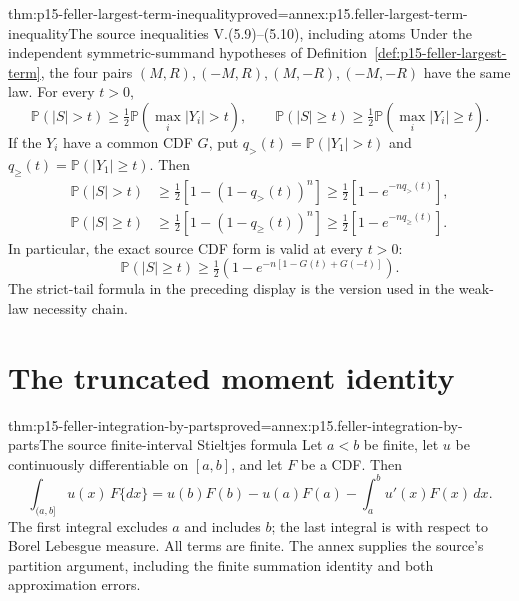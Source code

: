 \begin{hbtheorem}{thm:p15-feller-largest-term-inequality}{proved=annex:p15.feller-largest-term-inequality}{The source inequalities V.(5.9)--(5.10), including atoms}
Under the independent symmetric-summand hypotheses of
Definition~\ref{def:p15-feller-largest-term},
the four pairs \((M,R),(-M,R),(M,-R),(-M,-R)\) have the same
law. For every \(t>0\),
\[
 \mathbb P(|S|>t)\geq\tfrac12
                    \mathbb P(\max_i|Y_i|>t),\qquad
 \mathbb P(|S|\geq t)\geq\tfrac12
                    \mathbb P(\max_i|Y_i|\geq t).
\]
If the \(Y_i\) have a common CDF \(G\), put
\(q_>(t)=\mathbb P(|Y_1|>t)\) and
\(q_\geq(t)=\mathbb P(|Y_1|\geq t)\). Then
\[
 \begin{aligned}
 \mathbb P(|S|>t)&\geq\tfrac12[1-(1-q_>(t))^n]
                         \geq\tfrac12[1-e^{-nq_>(t)}],\\
 \mathbb P(|S|\geq t)&\geq\tfrac12[1-(1-q_\geq(t))^n]
                         \geq\tfrac12[1-e^{-nq_\geq(t)}].
 \end{aligned}
\]
In particular, the exact source CDF form is valid at every \(t>0\):
\[
 \mathbb P(|S|\geq t)
       \geq\tfrac12\left(1-e^{-n[1-G(t)+G(-t)]}\right).
\]
The strict-tail formula in the preceding display is the version used
in the weak-law necessity chain.
\end{hbtheorem}

\section{The truncated moment identity}
\label{sec:p15-feller-truncated-moment}

\begin{hbtheorem}{thm:p15-feller-integration-by-parts}{proved=annex:p15.feller-integration-by-parts}{The source finite-interval Stieltjes formula}
Let \(a<b\) be finite, let \(u\) be continuously differentiable
on \([a,b]\), and let \(F\) be a CDF. Then
\[
 \int_{(a,b]}u(x)\,F\{dx\}
 =u(b)F(b)-u(a)F(a)-\int_a^b u'(x)F(x)\,dx.
\]
The first integral excludes \(a\) and includes \(b\); the last
integral is with respect to Borel Lebesgue measure. All terms are
finite. The annex supplies the source's partition argument, including
the finite summation identity and both approximation errors.
\end{hbtheorem}

